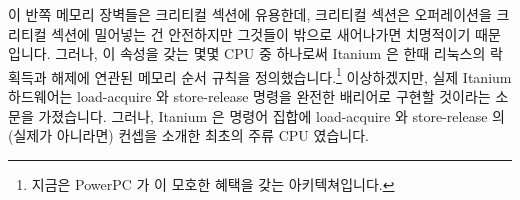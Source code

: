 \fi

이 반쪽 메모리 장벽들은 크리티컬 섹션에 유용한데, 크리티컬 섹션은 오퍼레이션을
크리티컬 섹션에 밀어넣는 건 안전하지만 그것들이 밖으로 새어나가면 치명적이기
때문입니다.
그러나, 이 속성을 갖는 몇몇 CPU 중 하나로써 Itanium 은 한때 리눅스의 락 획득과
해제에 연관된 메모리 순서 규칙을 정의했습니다.\footnote{
	지금은 PowerPC 가 이 모호한 혜택을 갖는 아키텍쳐입니다.}
이상하겠지만, 실제 Itanium 하드웨어는 load-acquire 와 store-release 명령을
완전한 배리어로 구현할 것이라는 소문을 가졌습니다.
그러나, Itanium 은 명령어 집합에 load-acquire 와 store-release 의 (실제가
아니라면) 컨셉을 소개한 최초의 주류 CPU 였습니다.

